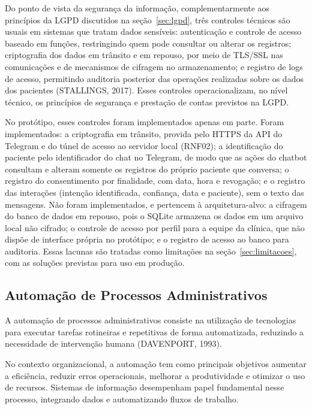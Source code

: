 \documentclass[12pt,a4paper]{extarticle}
\begin{document}
Do ponto de vista da segurança da informação, complementarmente aos princípios da LGPD discutidos na seção~\ref{sec:lgpd}, três controles técnicos são usuais em sistemas que tratam dados sensíveis: autenticação e controle de acesso baseado em funções, restringindo quem pode consultar ou alterar os registros; criptografia dos dados em trânsito e em repouso, por meio de TLS/SSL nas comunicações e de mecanismos de cifragem no armazenamento; e registro de logs de acesso, permitindo auditoria posterior das operações realizadas sobre os dados dos pacientes (STALLINGS, 2017). Esses controles operacionalizam, no nível técnico, os princípios de segurança e prestação de contas previstos na LGPD.

No protótipo, esses controles foram implementados apenas em parte. Foram implementados: a criptografia em trânsito, provida pelo HTTPS da API do Telegram e do túnel de acesso ao servidor local (RNF02); a identificação do paciente pelo identificador do chat no Telegram, de modo que as ações do chatbot consultam e alteram somente os registros do próprio paciente que conversa; o registro do consentimento por finalidade, com data, hora e revogação; e o registro das interações (intenção identificada, confiança, data e paciente), sem o texto das mensagens. Não foram implementados, e pertencem à arquitetura-alvo: a cifragem do banco de dados em repouso, pois o SQLite armazena os dados em um arquivo local não cifrado; o controle de acesso por perfil para a equipe da clínica, que não dispõe de interface própria no protótipo; e o registro de acesso ao banco para auditoria. Essas lacunas são tratadas como limitações na seção~\ref{sec:limitacoes}, com as soluções previstas para uso em produção.

\subsection{Automação de Processos Administrativos}

A automação de processos administrativos consiste na utilização de tecnologias para executar tarefas rotineiras e repetitivas de forma automatizada, reduzindo a necessidade de intervenção humana (DAVENPORT, 1993).

No contexto organizacional, a automação tem como principais objetivos aumentar a eficiência, reduzir erros operacionais, melhorar a produtividade e otimizar o uso de recursos. Sistemas de informação desempenham papel fundamental nesse processo, integrando dados e automatizando fluxos de trabalho.
\end{document}

